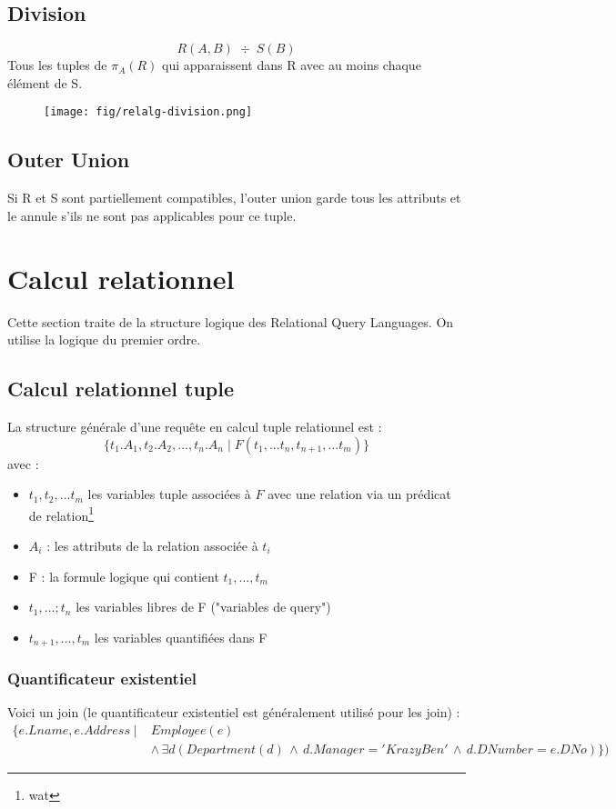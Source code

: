 \documentclass[a4paper]{article}
\begin{document}
  \subsection{Division}
  $$ R(A,B)\; \div\; S(B) $$
  Tous les tuples de $\pi_{A}(R)$ qui apparaissent dans R avec au moins chaque
  élément de S.

  \begin{figure}[H]
    \center
    \texttt{[image: fig/relalg-division.png]}
  \end{figure}

  \subsection{Outer Union}
  Si R et S sont partiellement compatibles, l'outer union garde tous les attributs
  et le annule s'ils ne sont pas applicables pour ce tuple.


\section{Calcul relationnel}
  Cette section traite de la structure logique des Relational Query Languages.
  On utilise la logique du premier ordre.\\

  \subsection{Calcul relationnel tuple}
  La structure générale d'une requête en calcul tuple relationnel est :
  $$ \{t_1.A_1, t_2.A_2,...,t_n.A_n\; | \; F(t_1, ... t_n,t_{n+1},...t_{m})\} $$
  avec :
  \begin{itemize}
    \item $t_1, t_2,...t_m$ les variables tuple associées à $F$ avec une relation
    via un prédicat de relation\footnote{wat}
    \item $A_i$ : les attributs de la relation associée à $t_i$
    \item F : la formule logique qui contient $t_1,...,t_m$
    \item $t_1,...;t_n$ les variables libres de F ("variables de query")
    \item $t_{n+1},...,t_m$ les variables quantifiées dans F
  \end{itemize}

  \subsubsection{Quantificateur existentiel}
  Voici un join (le quantificateur existentiel est généralement utilisé pour les
  join) :
  \begin{align*}
    \{e.Lname, e.Address\; | \; &Employee(e)\\
    &\land\, \exists d (Department(d) \,\land\, d.Manager = 'KrazyBen'\, \land\, d.DNumber = e.DNo)\} )
  \end{align*}
\end{document}
